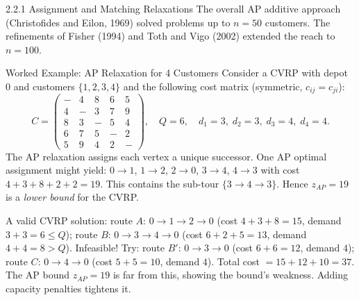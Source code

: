 \documentclass[aspectratio=169,10pt]{beamer}
\begin{document}
\begin{frame}[allowframebreaks]{2.2.1 Assignment and Matching Relaxations}
  The overall AP additive approach (Christofides and Eilon, 1969) solved
  problems up to $n=50$ customers. The refinements of Fisher (1994) and
  Toth and Vigo (2002) extended the reach to $n=100$.

  \framebreak

  \begin{exampleblock}{Worked Example: AP Relaxation for 4 Customers}
    Consider a CVRP with depot 0 and customers $\{1,2,3,4\}$ and the
    following cost matrix (symmetric, $c_{ij}=c_{ji}$):
    \[
      C = \begin{pmatrix}
            - & 4 & 8 & 6 & 5 \\
            4 & - & 3 & 7 & 9 \\
            8 & 3 & - & 5 & 4 \\
            6 & 7 & 5 & - & 2 \\
            5 & 9 & 4 & 2 & -
          \end{pmatrix}, \quad Q=6, \quad d_1=3,\;d_2=3,\;d_3=4,\;d_4=4.
    \]
    The AP relaxation assigns each vertex a unique successor. One AP
    optimal assignment might yield:
    $0\to 1$, $1\to 2$, $2\to 0$, $3\to 4$, $4\to 3$ with cost
    $4+3+8+2+2=19$. This contains the sub-tour $\{3\to 4\to 3\}$.
    Hence $z_{AP}=19$ is a \emph{lower bound} for the CVRP.

    A valid CVRP solution: route $A$: $0\to 1\to 2\to 0$ (cost $4+3+8=15$,
    demand $3+3=6\leq Q$); route $B$: $0\to 3\to 4\to 0$ (cost $6+2+5=13$,
    demand $4+4=8>Q$). Infeasible! Try: route $B'$: $0\to 3\to 0$ (cost
    $6+6=12$, demand $4$); route $C$: $0\to 4\to 0$ (cost $5+5=10$, demand
    $4$). Total cost $=15+12+10=37$. The AP bound $z_{AP}=19$ is far from
    this, showing the bound's weakness. Adding capacity penalties tightens it.
  \end{exampleblock}
\end{frame}
\end{document}
